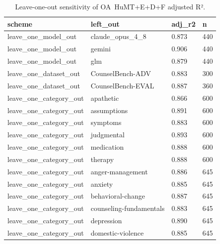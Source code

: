 \begin{table}[t]
\centering
\caption{Leave-one-out sensitivity of OA~HuMT+E+D+F adjusted R².}
\label{tab:sensitivity}
\begin{tabular}{llll}
\toprule
scheme & left\_out & adj\_r2 & n \\
\midrule
leave\_one\_model\_out & claude\_opus\_4\_8 & 0.873 & 440 \\
leave\_one\_model\_out & gemini & 0.906 & 440 \\
leave\_one\_model\_out & glm & 0.879 & 440 \\
leave\_one\_dataset\_out & CounselBench-ADV & 0.883 & 300 \\
leave\_one\_dataset\_out & CounselBench-EVAL & 0.887 & 360 \\
leave\_one\_category\_out & apathetic & 0.866 & 600 \\
leave\_one\_category\_out & assumptions & 0.891 & 600 \\
leave\_one\_category\_out & symptoms & 0.883 & 600 \\
leave\_one\_category\_out & judgmental & 0.893 & 600 \\
leave\_one\_category\_out & medication & 0.888 & 600 \\
leave\_one\_category\_out & therapy & 0.888 & 600 \\
leave\_one\_category\_out & anger-management & 0.886 & 645 \\
leave\_one\_category\_out & anxiety & 0.885 & 645 \\
leave\_one\_category\_out & behavioral-change & 0.887 & 645 \\
leave\_one\_category\_out & counseling-fundamentals & 0.883 & 645 \\
leave\_one\_category\_out & depression & 0.890 & 645 \\
leave\_one\_category\_out & domestic-violence & 0.885 & 645 \\
\bottomrule
\end{tabular}
\end{table}
